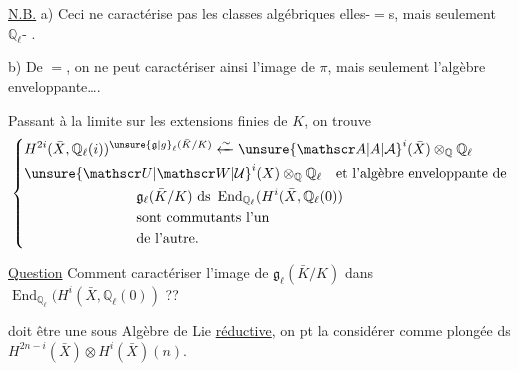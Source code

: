 \uline{N.B.} a) Ceci ne caractérise pas les classes algébriques elles-$=$s, mais seulement  $\mathbb Q_\ell$- .

b) De $=$, on ne peut caractériser ainsi l'image de $\pi$, mais seulement l'algèbre enveloppante\ldots.

Passant à la limite sur les extensions finies de $K$, on trouve
\[
\left\{\begin{aligned}
&H^{2i}(\bar X,\mathbb Q_\ell(i))^{\unsure{\mathfrak g|g}_\ell(\bar K/K)}
\xleftarrow{\sim}\unsure{\mathscr A|A|\mathcal A}^{i}(\bar X)\otimes_{\mathbb Q}\mathbb Q_\ell\\
&\unsure{\mathscr U|\mathscr W|\mathcal U}^i(X)\otimes_{\mathbb Q}\mathbb Q_\ell\quad\text{et l'algèbre enveloppante de}\\
&\hspace{8em}\mathfrak g_\ell(\bar K/K)\ \text{ds }\operatorname{End}_{\mathbb Q_\ell}(H^i(\bar X,\mathbb Q_\ell(0))\\
&\hspace{8em}\text{sont commutants l'un}\\
&\hspace{8em}\text{de l'autre.}
\end{aligned}\right.
\]

\uline{Question} Comment caractériser l'image de $\mathfrak g_\ell(\bar K/K)$ dans $\operatorname{End}_{\mathbb Q_\ell}(H^i(\bar X,\mathbb Q_\ell(0))$ ??

 doit être une sous Algèbre de Lie \uline{réductive}, on pt la considérer comme plongée ds $H^{2n-i}(\bar X)\otimes H^i(\bar X)(n)$.

